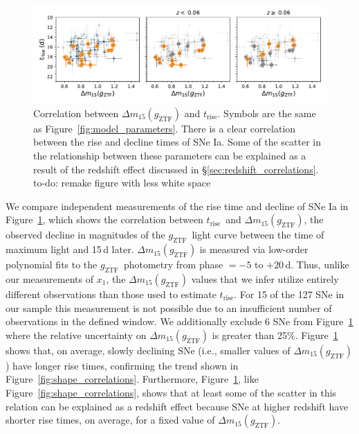 \documentclass[twocolumn]{./aastex63}
\newcommand{\todo}[1]{{\color{magenta} to-do: {#1}}}
\newcommand{\gztf}{$g_\mathrm{ZTF}$}
\newcommand{\trise}{$t_\mathrm{rise}$}
\begin{document}
\begin{figure}
    \centering
    \includegraphics[width=6in]{./figures/dm15_rise.pdf}
    \caption{Correlation between $\Delta m_{15}(g_\mathrm{ZTF})$ and \trise.
    Symbols are the same as Figure~\ref{fig:model_parameters}. There is a clear
    correlation between the rise and decline times of SNe Ia. Some of the
    scatter in the relationship between these parameters can be explained as a
    result of the redshift effect discussed in
    \S\ref{sec:redshift_correlations}. \todo{remake figure with less white
    space}}
    \label{fig:dm15}
\end{figure}

We compare independent measurements of the rise time and decline of SNe Ia in
Figure~\ref{fig:dm15}, which shows the correlation between \trise\ and $\Delta
m_{15}(g_\mathrm{ZTF})$, the observed decline in magnitudes of the \gztf\
light curve between the time of maximum light and 15\,d later. $\Delta
m_{15}(g_\mathrm{ZTF})$ is measured via low-order polynomial fits to the
\gztf\ photometry from phase $= -5$ to $+20$\,d. Thus, unlike our measurements
of $x_1$, the $\Delta m_{15}(g_\mathrm{ZTF})$ values that we infer utilize
entirely different observations than those used to estimate \trise. For 15 of
the 127 SNe in our sample this measurement is not possible due to an
insufficient number of observations in the defined window. We additionally
exclude 6 SNe from Figure~\ref{fig:dm15} where the relative uncertainty on
$\Delta m_{15}(g_\mathrm{ZTF})$ is greater than 25\%. Figure~\ref{fig:dm15}
shows that, on average, slowly declining SNe (i.e., smaller values of $\Delta
m_{15}(g_\mathrm{ZTF})$) have longer rise times, confirming the trend shown in
Figure~\ref{fig:shape_correlations}. Furthermore, Figure~\ref{fig:dm15}, like
Figure~\ref{fig:shape_correlations}, shows that at least some of the scatter
in this relation can be explained as a redshift effect because SNe at higher
redshift have shorter rise times, on average, for a fixed value of $\Delta
m_{15}(g_\mathrm{ZTF})$.
\end{document}
